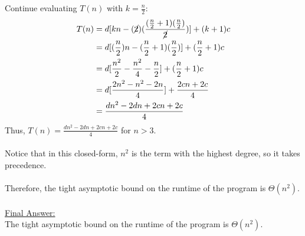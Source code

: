 \documentclass[12pt]{article}
\begin{document}
Continue evaluating $T(n)$ with $k = \frac{n}{2}$:
\begin{equation*}
    \begin{aligned}
        T(n) &= d[kn - (\cancel{2})(\frac{(\frac{n}{2} + 1)(\frac{n}{2})}{\cancel{2}})] + (k + 1)c \\
        &= d[(\frac{n}{2})n - (\frac{n}{2} + 1)(\frac{n}{2})] + (\frac{n}{2} + 1)c \\
        &= d[\frac{n^2}{2} - \frac{n^2}{4} - \frac{n}{2}] + (\frac{n}{2} + 1)c \\
        &= d[\frac{2n^2 - n^2 - 2n}{4}] + \frac{2cn + 2c}{4} \\
        &= \frac{dn^2 - 2dn + 2cn + 2c}{4}
    \end{aligned}
\end{equation*}
Thus, $T(n) = \frac{dn^2 - 2dn + 2cn + 2c}{4}$ for $n > 3$. \\
\\
Notice that in this closed-form, $n^2$ is the term with the highest degree, so it takes precedence. \\
\\
Therefore, the tight asymptotic bound on the runtime of the program is $\Theta (n^2)$. \\
\\
\underline{Final Answer:} \\
The tight asymptotic bound on the runtime of the program is $\Theta (n^2)$. \\
\end{document}
